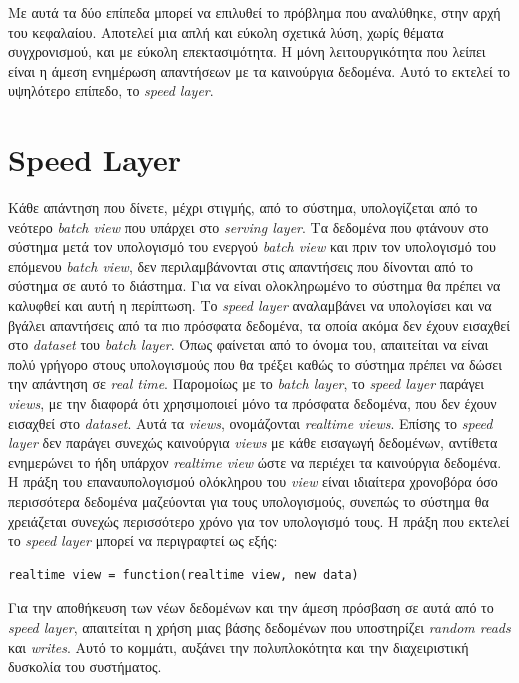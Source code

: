 Με αυτά τα δύο επίπεδα μπορεί να επιλυθεί το πρόβλημα που αναλύθηκε, στην αρχή του κεφαλαίου. Αποτελεί μια απλή και εύκολη σχετικά λύση, χωρίς θέματα συγχρονισμού, και με εύκολη επεκτασιμότητα. Η μόνη λειτουργικότητα που λείπει είναι η άμεση ενημέρωση απαντήσεων με τα καινούργια δεδομένα. Αυτό το εκτελεί το υψηλότερο επίπεδο, το \textit{speed layer}.

\section{Speed Layer}
Κάθε απάντηση που δίνετε, μέχρι στιγμής, από το σύστημα, υπολογίζεται από το νεότερο \textit{batch view} που υπάρχει στο \textit{serving layer}. Τα δεδομένα που φτάνουν στο σύστημα μετά τον υπολογισμό του ενεργού \textit{batch view} και πριν τον υπολογισμό του επόμενου \textit{batch view}, δεν περιλαμβάνονται στις απαντήσεις που δίνονται από το σύστημα σε αυτό το διάστημα. Για να είναι ολοκληρωμένο το σύστημα θα πρέπει να καλυφθεί και αυτή η περίπτωση. Το \textit{speed layer} αναλαμβάνει να υπολογίσει και να βγάλει απαντήσεις από τα πιο πρόσφατα δεδομένα, τα οποία ακόμα δεν έχουν εισαχθεί στο \textit{dataset} του \textit{batch layer}. Όπως φαίνεται από το όνομα του, απαιτείται να είναι πολύ γρήγορο στους υπολογισμούς που θα τρέξει καθώς το σύστημα πρέπει να δώσει την απάντηση σε \textit{real time}.
\newline
Παρομοίως με το \textit{batch layer}, το \textit{speed layer} παράγει \textit{views}, με την διαφορά ότι χρησιμοποιεί μόνο τα πρόσφατα δεδομένα, που δεν έχουν εισαχθεί στο \textit{dataset}. Αυτά τα \textit{views}, ονομάζονται \textit{realtime views}. Επίσης το \textit{speed layer} δεν παράγει συνεχώς καινούργια \textit{views} με κάθε εισαγωγή δεδομένων, αντίθετα ενημερώνει το ήδη υπάρχον \textit{realtime view} ώστε να περιέχει τα καινούργια δεδομένα. Η πράξη του επαναυπολογισμού ολόκληρου του \textit{view} είναι ιδιαίτερα χρονοβόρα όσο περισσότερα δεδομένα μαζεύονται για τους υπολογισμούς, συνεπώς το σύστημα θα χρειάζεται συνεχώς περισσότερο χρόνο για τον υπολογισμό τους.
\newline
Η πράξη που εκτελεί το \textit{speed layer} μπορεί να περιγραφτεί ως εξής:
\begin{verbatim}
realtime view = function(realtime view, new data)
\end{verbatim}
Για την αποθήκευση των νέων δεδομένων και την άμεση πρόσβαση σε αυτά από το \textit{speed layer}, απαιτείται η χρήση μιας βάσης δεδομένων που υποστηρίζει \textit{random reads} και \textit{writes}. Αυτό το κομμάτι, αυξάνει την πολυπλοκότητα και την διαχειριστική δυσκολία του συστήματος.
\newline

